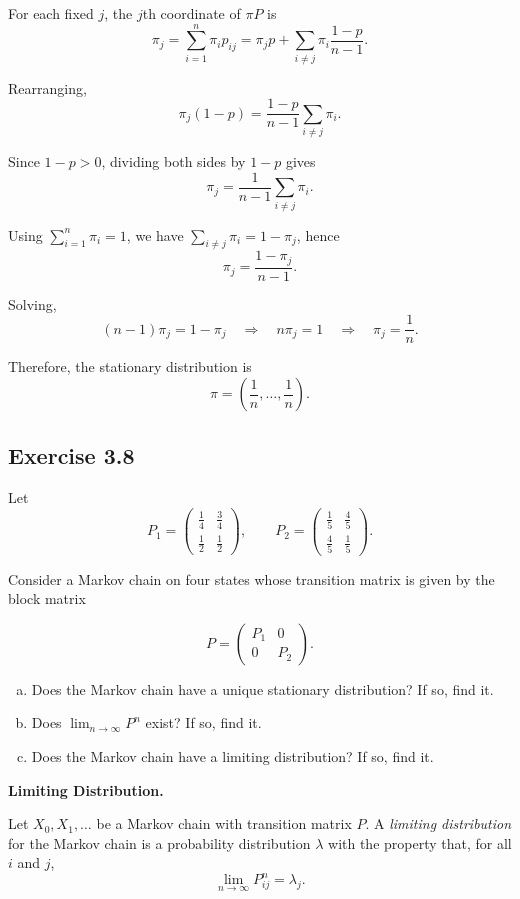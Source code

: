 \documentclass[hidelinks]{article}
\begin{document}
\smallskip

\noindent For each fixed $j$, the $j$th coordinate of $\pi P$ is
\[
\pi_j
= \sum_{i=1}^n \pi_i p_{ij}
= \pi_j p + \sum_{i\neq j} \pi_i \frac{1-p}{n-1}.
\]

\noindent Rearranging,
\[
\pi_j(1-p)
= \frac{1-p}{n-1} \sum_{i\neq j} \pi_i.
\]

\noindent Since $1-p>0$, dividing both sides by $1-p$ gives
\[
\pi_j
= \frac{1}{n-1} \sum_{i\neq j} \pi_i.
\]

\noindent Using $\sum_{i=1}^n \pi_i = 1$, we have $\sum_{i\neq j} \pi_i = 1-\pi_j$, hence
\[
\pi_j = \frac{1-\pi_j}{n-1}.
\]

\noindent Solving,
\[
(n-1)\pi_j = 1-\pi_j
\quad\Rightarrow\quad
n\pi_j = 1
\quad\Rightarrow\quad
\pi_j = \frac{1}{n}.
\]

\noindent Therefore, the stationary distribution is
\[
\boxed{\pi = \left(\frac1n,\ldots,\frac1n\right)}.
\]

\subsection{Exercise 3.8}

\noindent Let
\[
P_1 =
\begin{pmatrix}
\frac14 & \frac34 \\
\frac12 & \frac12
\end{pmatrix},
\qquad
P_2 =
\begin{pmatrix}
\frac15 & \frac45 \\
\frac45 & \frac15
\end{pmatrix}.
\]

\noindent Consider a Markov chain on four states whose transition matrix is given by the block matrix

\[
P =
\begin{pmatrix}
P_1 & 0 \\
0 & P_2
\end{pmatrix}.
\]

\begin{enumerate}[(a)]
\item Does the Markov chain have a unique stationary distribution? If so, find it.
\item Does $\lim_{n\to\infty} P^n$ exist? If so, find it.
\item Does the Markov chain have a limiting distribution? If so, find it.
\end{enumerate}

{\color{darkgreen}
\noindent \textbf{Limiting Distribution.}

\noindent Let $X_0, X_1, \ldots$ be a Markov chain with transition matrix $P$.
A \emph{limiting distribution} for the Markov chain is a probability distribution
$\lambda$ with the property that, for all $i$ and $j$,
\[
\lim_{n \to \infty} P^n_{ij} = \lambda_j.
\]
}
\end{document}
